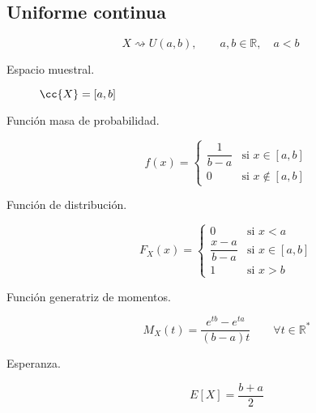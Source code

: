 \subsection{Uniforme continua}
\begin{equation*}
    X\rightsquigarrow U(a,b), \qquad a,b\in \mathbb{R}, \quad a<b
\end{equation*}
\begin{description}
    \item [Espacio muestral.] $\cc{X} = [a,b]$
    \item [Función masa de probabilidad.] 
        \begin{equation*}
            f(x) = \left\{\begin{array}{ll}
                    \dfrac{1}{b-a} & \text{si\ } x\in [a,b] \\
                    0 & \text{si\ } x\notin [a,b]
            \end{array}\right. 
        \end{equation*}
    \item [Función de distribución.] 
        \begin{equation*}
            F_X(x) = \left\{\begin{array}{ll}
                0 & \text{si\ } x<a \\
                \dfrac{x-a}{b-a} & \text{si\ } x\in [a,b]\\
                 1& \text{si\ } x>b
            \end{array}\right. 
        \end{equation*}
    \item [Función generatriz de momentos.] 
        \begin{equation*}
            M_X(t) = \dfrac{e^{tb}-e^{ta}}{(b-a)t} \qquad \forall t\in \mathbb{R}^\ast
        \end{equation*}
    \item [Esperanza.] 
        \begin{equation*}
            E[X] = \dfrac{b+a}{2}
        \end{equation*}
\end{description}

